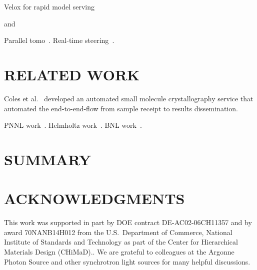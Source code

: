\documentclass{aip-cp}
\begin{document}

Velox for rapid model serving~\cite{crankshaw2014missing}

and~\cite{kumar2017data}


Parallel tomo~\cite{Bicer_Europar15}. Real-time steering~\cite{bicer2017real}.

\section{RELATED WORK}

Coles et al.~\cite{coles2005ecses,coles2006science} developed an automated small molecule crystallography service that automated the
end-to-end-flow from sample receipt to results dissemination.

PNNL work~\cite{thomas2015towards}. Helmholtz work~\cite{gehrke2015high}. BNL work~\cite{deslippe2014workflow}.


\section{SUMMARY}









\section{ACKNOWLEDGMENTS}

This work was supported in part by DOE contract DE-AC02-06CH11357 and by award 70NANB14H012 from the U.S.\  Department of Commerce, National Institute of Standards and Technology as part of the Center for Hierarchical Materials Design (CHiMaD)..
We are grateful to colleagues at the Argonne Photon Source and other synchrotron light sources
for many helpful discussions.


\nocite{*}
%
%
\end{document}
